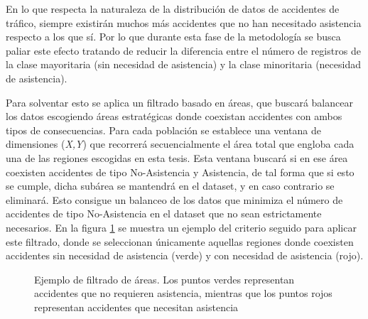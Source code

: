 En lo que respecta la naturaleza de la distribución de datos de accidentes de tráfico, siempre existirán muchos más accidentes que no han necesitado asistencia respecto a los que sí. Por lo que durante esta fase de la metodología se busca paliar este efecto tratando de reducir la diferencia entre el número de registros de la clase mayoritaria (sin necesidad de asistencia) y la clase minoritaria (necesidad de asistencia).

Para solventar esto se aplica un filtrado basado en áreas, que buscará balancear los datos escogiendo áreas estratégicas donde coexistan accidentes con ambos tipos de consecuencias. Para cada población se establece una ventana de dimensiones (\textit{X,Y}) que recorrerá secuencialmente el área total que engloba cada una de las regiones escogidas en esta tesis. Esta ventana buscará si en ese área coexisten accidentes de tipo No-Asistencia y Asistencia, de tal forma que si esto se cumple, dicha subárea se mantendrá en el dataset, y en caso contrario se eliminará. Esto consigue un balanceo de los datos que minimiza el número de accidentes de tipo No-Asistencia en el dataset que no sean estrictamente necesarios. En la figura \ref{Areas} se muestra un ejemplo del criterio seguido para aplicar este filtrado, donde se seleccionan únicamente aquellas regiones donde coexisten accidentes sin necesidad de asistencia (verde) y con necesidad de asistencia (rojo).


\begin{figure}[H]
	\centering    
	\caption{Ejemplo de filtrado de áreas. Los puntos verdes representan accidentes que no requieren asistencia, mientras que los puntos rojos representan accidentes que necesitan asistencia}
	\label{Areas}
\end{figure}

